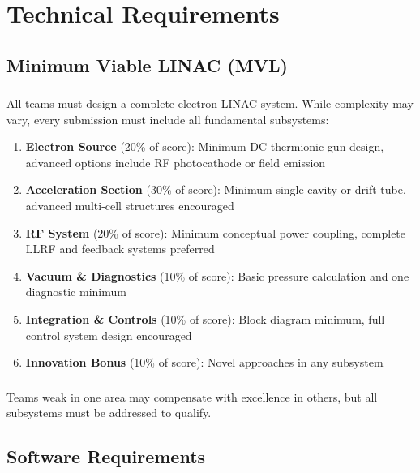 
\renewcommand{\thesection}{TR}
\section{Technical Requirements}

\subsection{Minimum Viable LINAC (MVL)}

\subsubsection{}
All teams must design a complete electron LINAC system. While complexity may vary, every submission must include all fundamental subsystems:

\begin{enumerate}[noitemsep]
    \item \textbf{Electron Source} (20\% of score): Minimum DC thermionic gun design, advanced options include RF photocathode or field emission
    \item \textbf{Acceleration Section} (30\% of score): Minimum single cavity or drift tube, advanced multi-cell structures encouraged
    \item \textbf{RF System} (20\% of score): Minimum conceptual power coupling, complete LLRF and feedback systems preferred
    \item \textbf{Vacuum \& Diagnostics} (10\% of score): Basic pressure calculation and one diagnostic minimum
    \item \textbf{Integration \& Controls} (10\% of score): Block diagram minimum, full control system design encouraged
    \item \textbf{Innovation Bonus} (10\% of score): Novel approaches in any subsystem
\end{enumerate}

\subsubsection{}
Teams weak in one area may compensate with excellence in others, but all subsystems must be addressed to qualify.

\subsection{Software Requirements}

